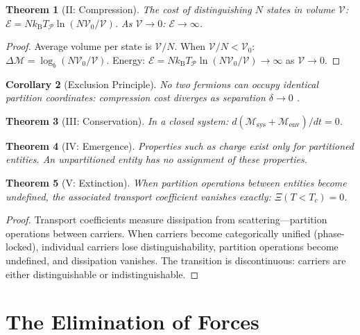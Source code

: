 \documentclass[11pt,twocolumn,a4paper]{article}
\newtheorem{theorem}{Theorem}[section]
\newtheorem{corollary}[theorem]{Corollary}
\theoremstyle{definition}
\theoremstyle{remark}
\newcommand{\kB}{k_{\mathrm{B}}}
\newcommand{\Depth}{\mathcal{M}}
\newcommand{\Cost}{\mathcal{E}}
\begin{document}
\begin{theorem}[II: Compression]
\label{thm:compression}
The cost of distinguishing $N$ states in volume $\mathcal{V}$: $\Cost = N\kB T_{\mathcal{P}} \ln(N\mathcal{V}_0/\mathcal{V})$. As $\mathcal{V} \to 0$: $\Cost \to \infty$.
\end{theorem}

\begin{proof}
Average volume per state is $\mathcal{V}/N$. When $\mathcal{V}/N < \mathcal{V}_0$: $\Delta\Depth = \log_b(N\mathcal{V}_0/\mathcal{V})$. Energy: $\Cost = N\kB T_{\mathcal{P}}\ln(N\mathcal{V}_0/\mathcal{V}) \to \infty$ as $\mathcal{V} \to 0$.
\end{proof}

\begin{corollary}[Exclusion Principle]
No two fermions can occupy identical partition coordinates: compression cost diverges as separation $\delta \to 0$ \citep{pauli1925}.
\end{corollary}

\begin{theorem}[III: Conservation]
\label{thm:conservation}
In a closed system: $d(\Depth_{\mathrm{sys}} + \Depth_{\mathrm{env}})/dt = 0$.
\end{theorem}

\begin{theorem}[IV: Emergence]
\label{thm:emergence}
Properties such as charge exist only for partitioned entities. An unpartitioned entity has no assignment of these properties.
\end{theorem}

\begin{theorem}[V: Extinction]
\label{thm:extinction}
When partition operations between entities become undefined, the associated transport coefficient vanishes exactly: $\Xi(T < T_c) = 0$.
\end{theorem}

\begin{proof}
Transport coefficients measure dissipation from scattering---partition operations between carriers. When carriers become categorically unified (phase-locked), individual carriers lose distinguishability, partition operations become undefined, and dissipation vanishes. The transition is discontinuous: carriers are either distinguishable or indistinguishable.
\end{proof}

\section{The Elimination of Forces}
\label{sec:elimination}
\end{document}

